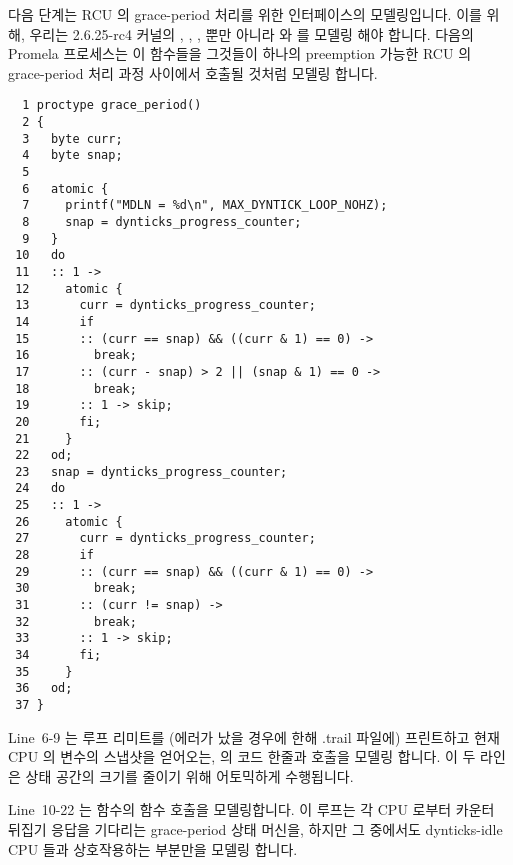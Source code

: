 다음 단계는 RCU 의 grace-period 처리를 위한 인터페이스의 모델링입니다.
이를 위해, 우리는 2.6.25-rc4 커널의
,
,
,
뿐만 아니라
 와
 를 모델링 해야 합니다.
다음의  Promela 프로세스는 이 함수들을 그것들이 하나의
preemption 가능한 RCU 의 grace-period 처리 과정 사이에서 호출될 것처럼 모델링
합니다.
\iffalse

The next step is to model the interface to RCU's grace-period
processing.
For this, we need to model
\co{dyntick_save_progress_counter()},
\co{rcu_try_flip_waitack_needed()},
\co{rcu_try_flip_waitmb_needed()},
as well as portions of
\co{rcu_try_flip_waitack()} and
\co{rcu_try_flip_waitmb()}, all from the 2.6.25-rc4 kernel.
The following \co{grace_period()} Promela process models
these functions as they would be invoked during a single pass
through preemptible RCU's grace-period processing.
\fi

{ \scriptsize
\begin{verbatim}
  1 proctype grace_period()
  2 {
  3   byte curr;
  4   byte snap;
  5
  6   atomic {
  7     printf("MDLN = %d\n", MAX_DYNTICK_LOOP_NOHZ);
  8     snap = dynticks_progress_counter;
  9   }
 10   do
 11   :: 1 ->
 12     atomic {
 13       curr = dynticks_progress_counter;
 14       if
 15       :: (curr == snap) && ((curr & 1) == 0) ->
 16         break;
 17       :: (curr - snap) > 2 || (snap & 1) == 0 ->
 18         break;
 19       :: 1 -> skip;
 20       fi;
 21     }
 22   od;
 23   snap = dynticks_progress_counter;
 24   do
 25   :: 1 ->
 26     atomic {
 27       curr = dynticks_progress_counter;
 28       if
 29       :: (curr == snap) && ((curr & 1) == 0) ->
 30         break;
 31       :: (curr != snap) ->
 32         break;
 33       :: 1 -> skip;
 34       fi;
 35     }
 36   od;
 37 }
\end{verbatim}
}

Line~6-9 는 루프 리미트를 (에러가 났을 경우에 한해 .trail 파일에) 프린트하고
현재 CPU 의  변수의 스냅샷을 얻어오는,
 의 코드 한줄과 
호출을 모델링 합니다.
이 두 라인은 상태 공간의 크기를 줄이기 위해 어토믹하게 수행됩니다.

Line~10-22 는  함수의
 함수 호출을 모델링합니다.
이 루프는 각 CPU 로부터 카운터 뒤집기 응답을 기다리는 grace-period 상태 머신을,
하지만 그 중에서도 dynticks-idle CPU 들과 상호작용하는 부분만을 모델링 합니다.
\iffalse

